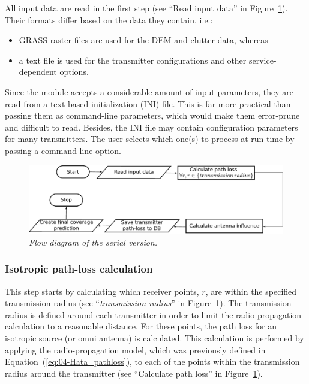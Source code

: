 All input data are read in the first step (see ``Read input data''
in Figure~\ref{fig:04-Flow_diagram_serial_version}). Their formats
differ based on the data they contain, i.e.:
\begin{itemize}
\item GRASS raster files are used for the DEM and clutter data, whereas
\item a text file is used for the transmitter configurations and other service-dependent
options.
\end{itemize}
Since the module accepts a considerable amount of input parameters,
they are read from a text-based initialization (INI)
file. This is far more practical than passing them as command-line
parameters, which would make them error-prune and difficult to read.
Besides, the INI file may contain configuration parameters for many
transmitters. The user selects which one(s) to process at run-time
by passing a command-line option.

\begin{figure}
\centering

\includegraphics[width=1\columnwidth]{04-framework_design_and_implementation/img/serial_implementation_flow_diagram}

\caption{\textit{\emph{Flow diagram of the serial version.}}\textit{\label{fig:04-Flow_diagram_serial_version}}}
\end{figure}



\subsubsection{Isotropic path-loss calculation\label{sub:04-Isotrophic_pahloss_calculation}}

This step starts by calculating which receiver points, $r$, are within
the specified transmission radius (see ``\emph{transmission radius}''
in Figure~\ref{fig:04-Flow_diagram_serial_version}). The transmission
radius is defined around each transmitter in order to limit the radio-propagation
calculation to a reasonable distance. For these points, the path loss
for an isotropic source (or omni antenna) is calculated. This calculation
is performed by applying the radio-propagation model, which was previously
defined in Equation~(\ref{eq:04-Hata_pathloss}), to each of the
points within the transmission radius around the transmitter (see
``Calculate path loss'' in Figure~\ref{fig:04-Flow_diagram_serial_version}).

